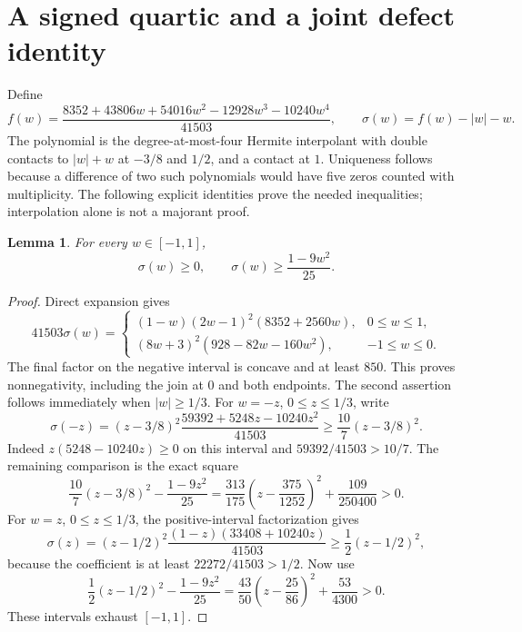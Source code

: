 \documentclass[11pt]{article}
\newtheorem{lemma}[theorem]{Lemma}
\theoremstyle{remark}\newtheorem{remark}[theorem]{Remark}
\numberwithin{equation}{section}
\begin{document}
\section{A signed quartic and a joint defect identity}\label{sec-quartic}
Define
\[
 f(w)=\frac{8352+43806w+54016w^2-12928w^3-10240w^4}{41503},
 \qquad \sigma(w)=f(w)-|w|-w.
\]
The polynomial is the degree-at-most-four Hermite interpolant with double
contacts to $|w|+w$ at $-3/8$ and $1/2$, and a contact at $1$.
Uniqueness follows because a difference of two such polynomials would have
five zeros counted with multiplicity. The following explicit identities prove
the needed inequalities; interpolation alone is not a majorant proof.
\begin{lemma}\label{scalar}
For every $w\in[-1,1]$,
\begin{equation}\label{sigmapoint}
 \sigma(w)\ge0,\qquad \sigma(w)\ge\frac{1-9w^2}{25}.
\end{equation}
\end{lemma}
\begin{proof}
Direct expansion gives
\[
 41503\sigma(w)=
 \begin{cases}
 (1-w)(2w-1)^2(8352+2560w),&0\le w\le1,\\
 (8w+3)^2(928-82w-160w^2),&-1\le w\le0.
 \end{cases}
\]
The final factor on the negative interval is concave and at least $850$.
This proves nonnegativity, including the join at $0$ and both endpoints.
The second assertion follows immediately when $|w|\ge1/3$.
For $w=-z$, $0\le z\le1/3$, write
\[
 \sigma(-z)=(z-3/8)^2
          \frac{59392+5248z-10240z^2}{41503}
       \ge\frac{10}{7}(z-3/8)^2.
\]
Indeed $z(5248-10240z)\ge0$ on this interval and
$59392/41503>10/7$. The remaining comparison is the exact square
\[
 \frac{10}{7}(z-3/8)^2-\frac{1-9z^2}{25}
  =\frac{313}{175}\left(z-\frac{375}{1252}\right)^2
                         +\frac{109}{250400}>0.
\]
For $w=z$, $0\le z\le1/3$, the positive-interval factorization gives
\[
 \sigma(z)=(z-1/2)^2\frac{(1-z)(33408+10240z)}{41503}
              \ge\frac12(z-1/2)^2,
\]
because the coefficient is at least $22272/41503>1/2$. Now use
\[
 \frac12(z-1/2)^2-\frac{1-9z^2}{25}
   =\frac{43}{50}\left(z-\frac{25}{86}\right)^2+\frac{53}{4300}>0.
\]
These intervals exhaust $[-1,1]$.
\end{proof}
\end{document}
